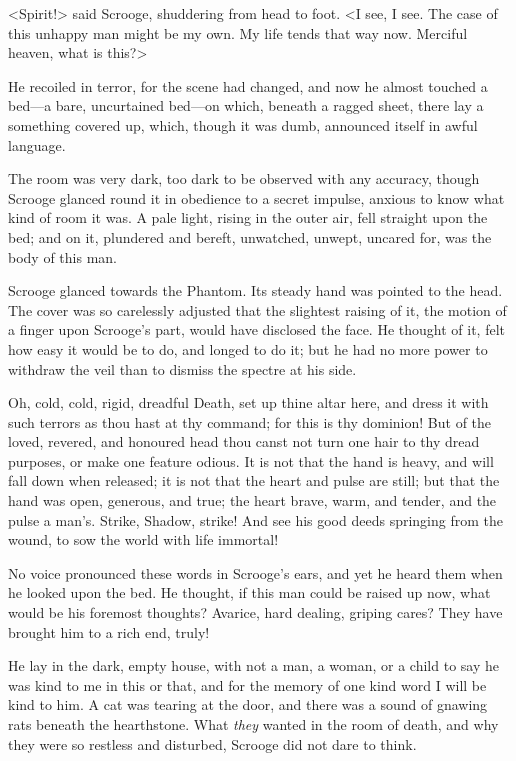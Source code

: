 <Spirit!> said Scrooge, shuddering from head to foot. <I see, I see. The case of
this unhappy man might be my own. My life tends that way now. Merciful heaven,
what is this?>

He recoiled in terror, for the scene had changed, and now he almost touched a
bed—a bare, uncurtained bed—on which, beneath a ragged sheet, there lay a
something covered up, which, though it was dumb, announced itself in awful
language.

The room was very dark, too dark to be observed with any accuracy, though
Scrooge glanced round it in obedience to a secret impulse, anxious to know what
kind of room it was. A pale light, rising in the outer air, fell straight upon
the bed; and on it, plunder\-ed and bereft, unwatched, unwept, uncared for, was
the body of this man.

Scrooge glanced towards the Phantom. Its steady hand was pointed to the head.
The cover was so carelessly adjusted that the slightest raising of it, the
motion of a finger upon Scrooge's part, would have disclosed the face. He
thought of it, felt how easy it would be to do, and longed to do it; but he had
no more power to withdraw the veil than to dismiss the spectre at his side.

Oh, cold, cold, rigid, dreadful Death, set up thine altar here, and dress it
with such terrors as thou hast at thy command; for this is thy dominion! But of
the loved, revered, and honoured head thou canst not turn one hair to thy dread
purposes, or make one feature odious. It is not that the hand is heavy, and will
fall down when released; it is not that the heart and pulse are still; but that
the hand was open, generous, and true; the heart brave, warm, and tender, and
the pulse a man's. Strike, Shadow, strike! And see his good deeds springing from
the wound, to sow the world with life immortal!

No voice pronounced these words in Scrooge's ears, and yet he heard them when he
looked upon the bed. He thought, if this man could be raised up now, what would
be his foremost thoughts? Avarice, hard dealing, griping cares? They have
brought him to a rich end, truly!

He lay in the dark, empty house, with not a man, a woman, or a child to say he
was kind to me in this or that, and for the memory of one kind word I will be
kind to him. A cat was tearing at the door, and there was a sound of gnawing
rats beneath the hearthstone. What \emph{they} wanted in the room of death, and
why they were so restless and disturbed, Scrooge did not dare to think.

